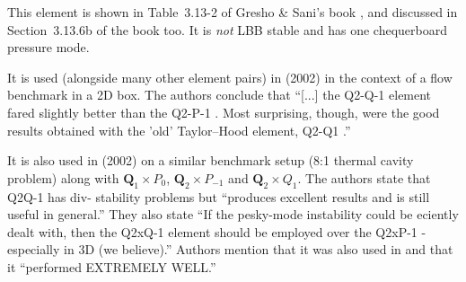 This element is shown in Table~3.13-2 of Gresho \& Sani's book \cite{grsa}, 
and discussed in Section~3.13.6b of the book too. It is {\it not} LBB stable
and has one chequerboard pressure mode.

It is used (alongside many other element pairs) in \textcite{chgs02} (2002) in the context of 
a flow benchmark in a 2D box. The authors conclude that ``[...] the Q2-Q-1 element fared
slightly better than the Q2-P-1 . Most surprising, though, were the good results obtained with
the 'old' Taylor–Hood element, Q2-Q1 .''

It is also used in \textcite{grsu02} (2002) on a similar benchmark setup (8:1 thermal 
cavity problem) along with ${\bm Q}_1\times P_0$, ${\bm Q}_2\times P_{-1}$ and 
${\bm Q}_2\times Q_1$. The authors state that Q2Q-1 has div- stability problems
but ``produces excellent results and is still useful in general.''
They also state ``If the pesky-mode instability could be eciently dealt with, then the Q2xQ-1 element
should be employed over the Q2xP-1 -especially in 3D (we believe).''
Authors mention that it was also used in \textcite{dejo83} and that it ``performed
EXTREMELY WELL.''

 
